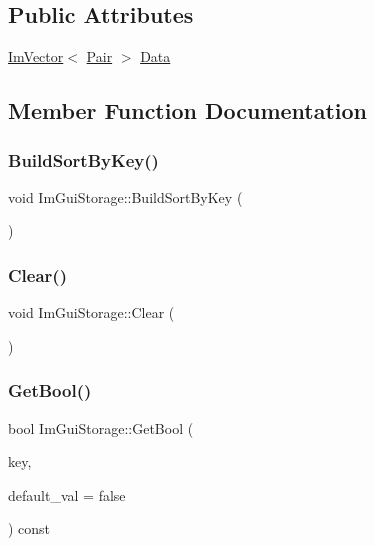 \subsection*{Public Attributes}
\begin{DoxyCompactItemize}
\item 
\hyperlink{class_im_vector}{Im\+Vector}$<$ \hyperlink{struct_im_gui_storage_1_1_pair}{Pair} $>$ \hyperlink{struct_im_gui_storage_aab0b9789fac598a34c500459259fde42}{Data}
\end{DoxyCompactItemize}


\subsection{Member Function Documentation}
\hypertarget{struct_im_gui_storage_a5eae75e98a65c146e99898e359225f99}{}\label{struct_im_gui_storage_a5eae75e98a65c146e99898e359225f99} 
\subsubsection{\texorpdfstring{Build\+Sort\+By\+Key()}{BuildSortByKey()}}
{\footnotesize\ttfamily void Im\+Gui\+Storage\+::\+Build\+Sort\+By\+Key (\begin{DoxyParamCaption}{ }\end{DoxyParamCaption})}

\hypertarget{struct_im_gui_storage_a72ceecfbca3d08df8c2a232b77890c20}{}\label{struct_im_gui_storage_a72ceecfbca3d08df8c2a232b77890c20} 
\subsubsection{\texorpdfstring{Clear()}{Clear()}}
{\footnotesize\ttfamily void Im\+Gui\+Storage\+::\+Clear (\begin{DoxyParamCaption}{ }\end{DoxyParamCaption})}

\hypertarget{struct_im_gui_storage_a22d34ae6278f86468a3e7df8fbd1b632}{}\label{struct_im_gui_storage_a22d34ae6278f86468a3e7df8fbd1b632} 
\subsubsection{\texorpdfstring{Get\+Bool()}{GetBool()}}
{\footnotesize\ttfamily bool Im\+Gui\+Storage\+::\+Get\+Bool (\begin{DoxyParamCaption}\item[{Im\+Gui\+ID}]{key,  }\item[{bool}]{default\+\_\+val = {\ttfamily false} }\end{DoxyParamCaption}) const}

